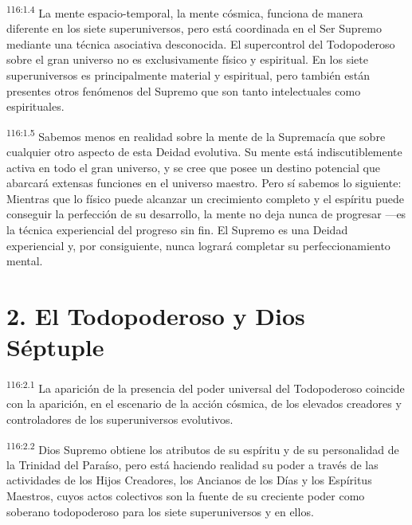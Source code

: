 \par
\textsuperscript{116:1.4} La mente espacio-temporal, la mente cósmica, funciona de manera diferente en los siete superuniversos, pero está coordinada en el Ser Supremo mediante una técnica asociativa desconocida. El supercontrol del Todopoderoso sobre el gran universo no es exclusivamente físico y espiritual. En los siete superuniversos es principalmente material y espiritual, pero también están presentes otros fenómenos del Supremo que son tanto intelectuales como espirituales.

\par
\textsuperscript{116:1.5} Sabemos menos en realidad sobre la mente de la Supremacía que sobre cualquier otro aspecto de esta Deidad evolutiva. Su mente está indiscutiblemente activa en todo el gran universo, y se cree que posee un destino potencial que abarcará extensas funciones en el universo maestro. Pero sí sabemos lo siguiente: Mientras que lo físico puede alcanzar un crecimiento completo y el espíritu puede conseguir la perfección de su desarrollo, la mente no deja nunca de progresar ---es la técnica experiencial del progreso sin fin. El Supremo es una Deidad experiencial y, por consiguiente, nunca logrará completar su perfeccionamiento mental.

\section*{2. El Todopoderoso y Dios Séptuple}
\par
\textsuperscript{116:2.1} La aparición de la presencia del poder universal del Todopoderoso coincide con la aparición, en el escenario de la acción cósmica, de los elevados creadores y controladores de los superuniversos evolutivos.

\par
\textsuperscript{116:2.2} Dios Supremo obtiene los atributos de su espíritu y de su personalidad de la Trinidad del Paraíso, pero está haciendo realidad su poder a través de las actividades de los Hijos Creadores, los Ancianos de los Días y los Espíritus Maestros, cuyos actos colectivos son la fuente de su creciente poder como soberano todopoderoso para los siete superuniversos y en ellos.

